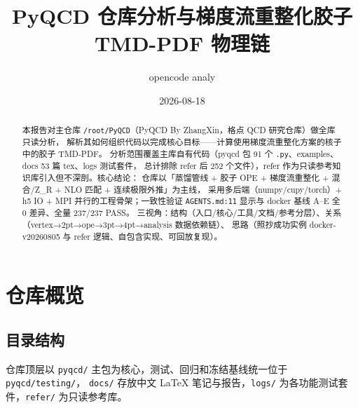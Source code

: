 \documentclass[UTF8]{ctexart}
\title{PyQCD 仓库分析与梯度流重整化胶子 TMD-PDF 物理链}
\author{opencode analy}
\date{2026-08-18}
\begin{document}
\maketitle
\sloppy

\begin{abstract}
本报告对主仓库 \texttt{/root/PyQCD}（PyQCD By ZhangXin，格点 QCD 研究仓库）做全库只读分析，
解析其如何组织代码以完成核心目标——\textcolor{struct}{计算使用梯度流重整化方案的核子中的胶子 TMD-PDF}。
分析范围覆盖主库自有代码（pyqcd 包 91 个 \texttt{.py}、examples、docs 53 篇 tex、logs 测试套件，
总计排除 refer 后 252 个文件），refer 作为只读参考知识库引入但不深剖。核心结论：
仓库以「蒸馏管线 + 胶子 OPE + 梯度流重整化 + 混合/Z\_R + NLO 匹配 + 连续极限外推」为主线，
采用多后端（numpy/cupy/torch）+ h5 IO + MPI 并行的工程骨架；一致性验证
\textcolor{evidence}{\nolinkurl{AGENTS.md:11}} 显示与 docker 基线 A–E 全 0 差异、全量 237/237 PASS。
三视角：结构（入口/核心/工具/文档/参考分层）、关系（vertex→2pt→ope→3pt→4pt→analysis 数据依赖链）、
思路（照抄成功实例 docker-v20260805 与 refer 逻辑、自包含实现、可回放复现）。
\end{abstract}

\tableofcontents

\section{仓库概览}
\subsection{目录结构}
仓库顶层以 \texttt{pyqcd/} 主包为核心，测试、回归和冻结基线统一位于
\texttt{pyqcd/testing/}，
\texttt{docs/} 存放中文 LaTeX 笔记与报告，\texttt{logs/} 为各功能测试套件，\texttt{refer/} 为只读参考库。

\end{document}
